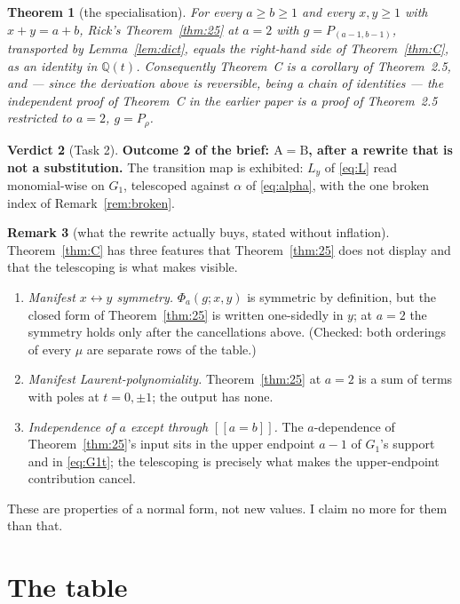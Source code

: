 \documentclass[11pt]{article}
\newtheorem{theorem}{Theorem}
\theoremstyle{definition}
\newtheorem{remark}[theorem]{Remark}
\newtheorem{verdict}[theorem]{Verdict}
\newcommand{\QQ}{\mathbb{Q}}
\newcommand{\lb}{[\![}
\newcommand{\rb}{]\!]}
\begin{document}
\begin{theorem}[the specialisation]\label{thm:main}
For every $a\ge b\ge1$ and every $x,y\ge1$ with $x+y=a+b$, Rick's Theorem~\ref{thm:25} at $a=2$
with $g=P_{(a-1,b-1)}$, transported by Lemma~\ref{lem:dict}, equals the right-hand side of
Theorem~\ref{thm:C}, as an identity in $\QQ(t)$. Consequently Theorem~C is a corollary of
Theorem~2.5, and --- since the derivation above is reversible, being a chain of identities ---
the independent proof of Theorem~C in the earlier paper is a proof of Theorem~2.5 restricted to
$a=2$, $g=P_\rho$.
\end{theorem}

\begin{verdict}[Task 2]
\textbf{Outcome 2 of the brief: $\mathrm{A}=\mathrm{B}$, after a rewrite that is not a
substitution.} The transition map is exhibited: $L_y$ of \eqref{eq:L} read monomial-wise on
$G_1$, telescoped against $\alpha$ of \eqref{eq:alpha}, with the one broken index of
Remark~\ref{rem:broken}.
\end{verdict}

\begin{remark}[what the rewrite actually buys, stated without inflation]
Theorem~\ref{thm:C} has three features that Theorem~\ref{thm:25} does not display and that the
telescoping is what makes visible.
\begin{enumerate}[label=(\arabic*)]
\item \emph{Manifest $x\leftrightarrow y$ symmetry.} $\Phi_a(g;x,y)$ is symmetric by definition,
but the closed form of Theorem~\ref{thm:25} is written one-sidedly in $y$; at $a=2$ the symmetry
holds only after the cancellations above. (Checked: both orderings of every $\mu$ are separate rows
of the table.)
\item \emph{Manifest Laurent-polynomiality.} Theorem~\ref{thm:25} at $a=2$ is a sum of terms with
poles at $t=0,\pm1$; the output has none.
\item \emph{Independence of $a$ except through $\lb a=b\rb$.} The $a$-dependence of
Theorem~\ref{thm:25}'s input sits in the upper endpoint $a-1$ of $G_1$'s support and in
\eqref{eq:G1t}; the telescoping is precisely what makes the upper-endpoint contribution cancel.
\end{enumerate}
These are properties of a normal form, not new values. I claim no more for them than that.
\end{remark}

\section{The table}\label{sec:table}
\end{document}
